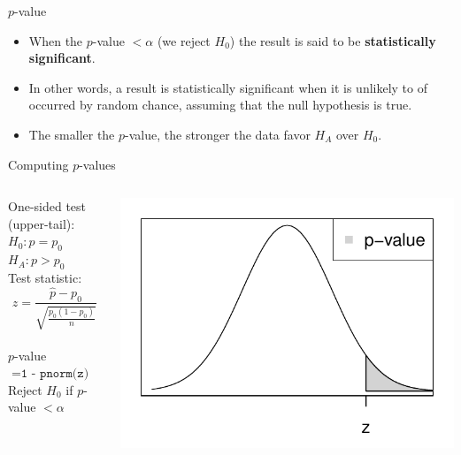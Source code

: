 \documentclass[fleqn, 11pt]{beamer}
\begin{document}
\begin{frame}{$p$-value}
\begin{itemize}
\item When the $p$-value $< \alpha$ (we reject $H_0$) the result is said to be \textbf{statistically significant}.
\vspace{10pt}
\item In other words, a result is statistically significant when it is unlikely to of occurred by random chance, assuming that the null hypothesis is true.
\vspace{10pt}
\item The smaller the $p$-value, the stronger the data favor $H_A$ over $H_0$.
\end{itemize}
\end{frame}

\begin{frame}{Computing $p$-values}
\begin{columns}
\begin{column}{0.45\textwidth}
One-sided test (upper-tail):\\
$H_0: p = p_0$\\
$H_A: p > p_0$\\
\vspace{10pt}
Test statistic:\\
\[ z = \frac{\hat{p} - p_0}{\sqrt{\frac{p_0(1-p_0)}{n}}} \]\\
\vspace{10pt}
$p$-value $= \texttt{1 - pnorm(z)}$\\ 
\vspace{10pt}
Reject $H_0$ if $p$-value $< \alpha$\\
\end{column}
\begin{column}{0.5\textwidth}
\includegraphics[scale=0.5]{figure/pvalue_upper.pdf}
\end{column}
\end{columns}
\end{frame}
\end{document}
